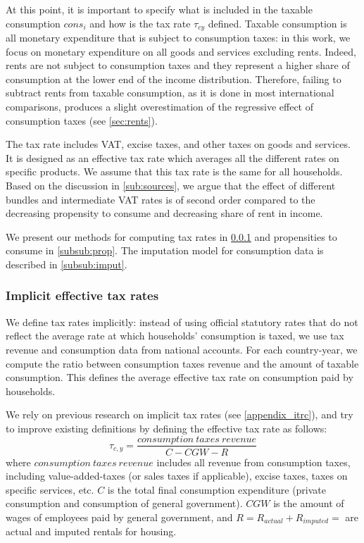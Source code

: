 \documentclass[12pt]{article}
\begin{document}
At this point, it is important to specify what is included in the taxable consumption $cons_i$ and how is the tax rate $\tau_{cy}$ defined. Taxable consumption is all monetary expenditure that is subject to consumption taxes: in this work, we focus on monetary expenditure on all goods and services excluding rents. Indeed, rents are not subject to consumption taxes and they represent a higher share of consumption at the lower end of the income distribution. Therefore, failing to subtract rents from taxable consumption, as it is done in most international comparisons, produces a slight overestimation of the regressive effect of consumption taxes (see \cref{sec:rents}). 

The tax rate includes VAT, excise taxes, and other taxes on goods and services. It is designed as an effective tax rate which averages all the different rates on specific products. We assume that this tax rate is the same for all households. Based on the discussion in \cref{sub:sources}, we argue that the effect of different bundles and intermediate VAT rates is of second order compared to the decreasing propensity to consume and decreasing share of rent in income.

We present our methods for computing tax rates in \cref{subsub:ITR} and propensities to consume in \cref{subsub:prop}. The imputation model for consumption data is described in \cref{subsub:imput}.

\subsubsection{Implicit effective tax rates}
\label{subsub:ITR}

We define tax rates implicitly: instead of using official statutory rates that do not reflect the average rate at which households' consumption is taxed, we use tax revenue and consumption data from national accounts. For each country-year, we compute the ratio between consumption taxes revenue and the amount of taxable consumption. This defines the average effective tax rate on consumption paid by households.

We rely on previous research on implicit tax rates (see \cref{appendix_itrc}), and try to improve existing definitions by defining the effective tax rate as follows:
\[ \tau_{c,y} = \frac{consumption\ taxes\ revenue}{C - CGW - R} \]
where $consumption\ taxes\ revenue$ includes all revenue from consumption taxes, including value-added-taxes (or sales taxes if applicable), excise taxes, taxes on specific services, etc. $C$ is the total final consumption expenditure (private consumption and consumption of general government). $CGW$ is the amount of wages of employees paid by general government, and $R = R_{actual} + R_{imputed} =$ are actual and imputed rentals for housing.
\end{document}
